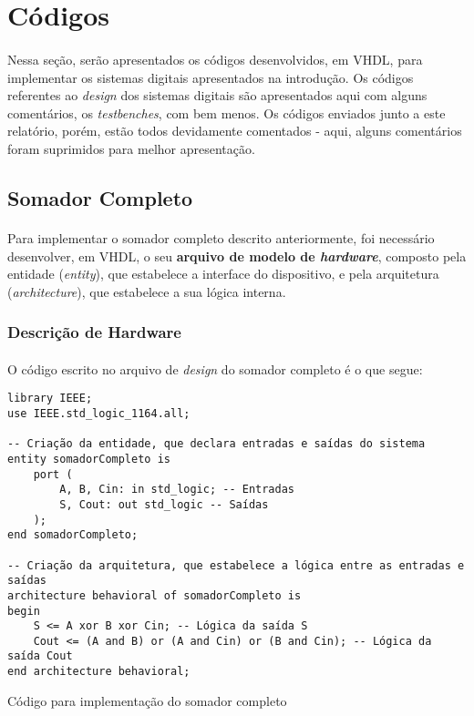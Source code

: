 \documentclass[a4paper,12pt]{article}
\newenvironment{code}{\captionsetup{type=listing}}{}
\begin{document}
\newpage

\section{Códigos}
\paragraph{}
Nessa seção, serão apresentados os códigos desenvolvidos, em VHDL, para implementar os sistemas digitais apresentados na introdução. Os códigos referentes ao \textit{design} dos sistemas digitais são apresentados aqui com alguns comentários, os \textit{testbenches}, com bem menos. Os códigos enviados junto a este relatório, porém, estão todos devidamente comentados - aqui, alguns comentários foram suprimidos para melhor apresentação.

\subsection{Somador Completo}
\paragraph{}
Para implementar o somador completo descrito anteriormente, foi necessário desenvolver, em VHDL, o seu \textbf{arquivo de modelo de \textit{hardware}}, composto pela entidade (\textit{entity}), que estabelece a interface do dispositivo, e pela arquitetura (\textit{architecture}), que estabelece a sua lógica interna.

\subsubsection{Descrição de Hardware}
\paragraph{}
O código escrito no arquivo de \textit{design} do somador completo é o que segue:

\begin{code}
\begin{verbatim}
library IEEE;
use IEEE.std_logic_1164.all;

-- Criação da entidade, que declara entradas e saídas do sistema
entity somadorCompleto is
    port (
        A, B, Cin: in std_logic; -- Entradas
        S, Cout: out std_logic -- Saídas
    );
end somadorCompleto;

-- Criação da arquitetura, que estabelece a lógica entre as entradas e saídas
architecture behavioral of somadorCompleto is
begin
    S <= A xor B xor Cin; -- Lógica da saída S
    Cout <= (A and B) or (A and Cin) or (B and Cin); -- Lógica da saída Cout
end architecture behavioral;
\end{verbatim}
\caption{Código para implementação do somador completo}
\end{code}
\end{document}
